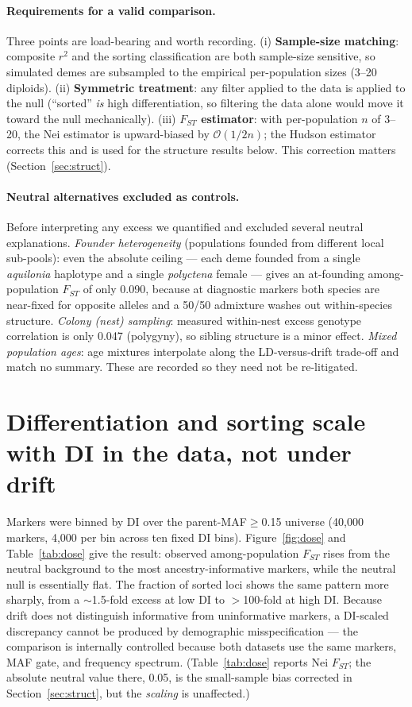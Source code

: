 \documentclass[11pt,a4paper]{article}
\begin{document}
\paragraph{Requirements for a valid comparison.}
Three points are load-bearing and worth recording. (i) \textbf{Sample-size
matching}: composite $r^2$ and the sorting classification are both sample-size
sensitive, so simulated demes are subsampled to the empirical per-population sizes
(3--20 diploids). (ii) \textbf{Symmetric treatment}: any filter applied to the data
is applied to the null (``sorted'' \emph{is} high differentiation, so filtering the
data alone would move it toward the null mechanically). (iii) \textbf{$F_{ST}$
estimator}: with per-population $n$ of 3--20, the Nei estimator is upward-biased by
$\mathcal{O}(1/2n)$; the Hudson estimator corrects this and is used for the
structure results below. This correction matters (Section~\ref{sec:struct}).

\paragraph{Neutral alternatives excluded as controls.}
Before interpreting any excess we quantified and excluded several neutral
explanations. \emph{Founder heterogeneity} (populations founded from different
local sub-pools): even the absolute ceiling --- each deme founded from a single
\textit{aquilonia} haplotype and a single \textit{polyctena} female --- gives an
at-founding among-population $F_{ST}$ of only 0.090, because at diagnostic markers
both species are near-fixed for opposite alleles and a 50/50 admixture washes out
within-species structure. \emph{Colony (nest) sampling}: measured within-nest
excess genotype correlation is only 0.047 (polygyny), so sibling structure is a
minor effect. \emph{Mixed population ages}: age mixtures interpolate along the
LD-versus-drift trade-off and match no summary. These are recorded so they need
not be re-litigated.

\section{Differentiation and sorting scale with DI in the data, not under drift}

Markers were binned by DI over the parent-MAF$\ge$0.15 universe (40{,}000 markers,
4{,}000 per bin across ten fixed DI bins). Figure~\ref{fig:dose} and
Table~\ref{tab:dose} give the result: observed among-population $F_{ST}$ rises from
the neutral background to the most ancestry-informative markers, while the neutral
null is essentially flat. The fraction of sorted loci shows the same pattern more
sharply, from a $\sim$1.5-fold excess at low DI to $>$100-fold at high DI. Because
drift does not distinguish informative from uninformative markers, a DI-scaled
discrepancy cannot be produced by demographic misspecification --- the comparison
is internally controlled because both datasets use the same markers, MAF gate, and
frequency spectrum. (Table~\ref{tab:dose} reports Nei $F_{ST}$; the absolute
neutral value there, 0.05, is the small-sample bias corrected in
Section~\ref{sec:struct}, but the \emph{scaling} is unaffected.)
\end{document}
